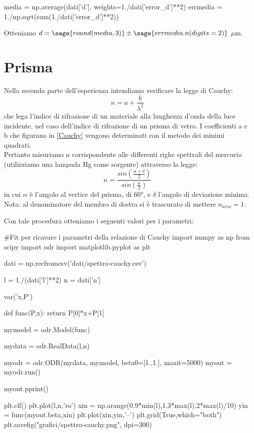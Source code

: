 \begin{sagesilent}
media = np.average(dati['d'], weights=1./dati['error_d']**2)
errmedia = 1./np.sqrt(sum(1./dati['error_d']**2))
\end{sagesilent}

Otteniamo $d=\sage{round(media, 3)}\pm\sage{errmedia.n(digits=2)}$ $\mu$m.




\section*{Prisma}


Nella seconda parte dell'esperienza intendiamo verificare la legge di Cauchy:
\begin{equation}
n = a + \frac{b}{\lambda^2}
\label{Cauchy}
\end{equation}
che lega l'indice di rifrazione di un materiale alla lunghezza d'onda della luce incidente, nel caso dell'indice di rifrazione di un prisma di vetro.
I coefficienti a e b che figurano in \ref{Cauchy} vengono determinati con il metodo dei minimi quadrati. \\
Pertanto misuriamo n corrispondente alle differenti righe spettrali del mercurio (utilizziamo una lampada Hg come sorgente) attraverso la legge:
\begin{equation}
n = \frac{sin(\frac{\alpha + \delta}{2})}{sin(\frac{\alpha}{2})}
\label{n}
\end{equation}
in cui $\alpha$ è l'angolo al vertice del prisma, di $60°$, e $\delta$ l'angolo di deviazione minima. Nota: al denominatore del membro di destra si è trascurato di mettere $n_{aria}=1$.

Con tale procedura otteniamo i seguenti valori per i parametri:


\begin{sagesilent}
 #Fit per ricavare i parametri della relazione di Cauchy
import numpy as np
from scipy import odr
import matplotlib.pyplot as plt

dati = np.recfromcsv('dati/spettro-cauchy.csv')

l = 1./(dati['l']**2)
n = dati['n']

var('x,P')

def func(P,x):
    return P[0]*x+P[1]
    
mymodel = odr.Model(func)

mydata = odr.RealData(l,n)

myodr = odr.ODR(mydata, mymodel, beta0=[1.,1.],  maxit=5000)
myout = myodr.run()

myout.pprint()
   
plt.clf()
plt.plot(l,n,'ro')
xin = np.arange(0.9*min(l),1.3*max(l),2*max(l)/10) 
yin = func(myout.beta,xin)
plt.plot(xin,yin,'--')
plt.grid(True,which="both")
plt.savefig("grafici/spettro-cauchy.png", dpi=300)

\end{sagesilent}


